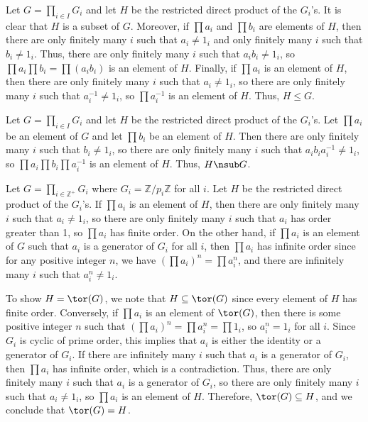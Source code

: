 \begin{solalph}
    \item Let $G = \prod_{i \in I} G_i$ and let $H$ be the restricted direct product of the $G_i$'s. It is clear that $H$ is a subset of $G$. Moreover, if $\prod a_i$ and $\prod b_i$ are elements of $H$, then there are only finitely many $i$ such that $a_i \neq 1_i$ and only finitely many $i$ such that $b_i \neq 1_i$. Thus, there are only finitely many $i$ such that $a_i b_i \neq 1_i$, so $\prod a_i \prod b_i = \prod (a_i b_i)$ is an element of $H$. Finally, if $\prod a_i$ is an element of $H$, then there are only finitely many $i$ such that $a_i \neq 1_i$, so there are only finitely many $i$ such that $a_i^{-1} \neq 1_i$, so $\prod a_i^{-1}$ is an element of $H$. Thus, $H \leq G$.
    \item Let $G = \prod_{i \in I} G_i$ and let $H$ be the restricted direct product of the $G_i$'s. Let $\prod a_i$ be an element of $G$ and let $\prod b_i$ be an element of $H$. Then there are only finitely many $i$ such that $b_i \neq 1_i$, so there are only finitely many $i$ such that $a_i b_i a_i^{-1} \neq 1_i$, so $\prod a_i \prod b_i \prod a_i^{-1}$ is an element of $H$. Thus, $H \nsub G$.
    \item Let $G = \prod_{i \in \mathbb{Z}^+} G_i$ where $G_i = \mathbb{Z}/p_i\mathbb{Z}$ for all $i$. Let $H$ be the restricted direct product of the $G_i$'s. If $\prod a_i$ is an element of $H$, then there are only finitely many $i$ such that $a_i \neq 1_i$, so there are only finitely many $i$ such that $a_i$ has order greater than 1, so $\prod a_i$ has finite order. On the other hand, if $\prod a_i$ is an element of $G$ such that $a_i$ is a generator of $G_i$ for all $i$, then $\prod a_i$ has infinite order since for any positive integer $n$, we have $(\prod a_i)^n = \prod a_i^n$, and there are infinitely many $i$ such that $a_i^n \neq 1_i$.
    
    To show $H = \tor(G)$, we note that $H \subseteq \tor(G)$ since every element of $H$ has finite order. Conversely, if $\prod a_i$ is an element of $\tor(G)$, then there is some positive integer $n$ such that $(\prod a_i)^n = \prod a_i^n = \prod 1_i$, so $a_i^n = 1_i$ for all $i$. Since $G_i$ is cyclic of prime order, this implies that $a_i$ is either the identity or a generator of $G_i$. If there are infinitely many $i$ such that $a_i$ is a generator of $G_i$, then $\prod a_i$ has infinite order, which is a contradiction. Thus, there are only finitely many $i$ such that $a_i$ is a generator of $G_i$, so there are only finitely many $i$ such that $a_i \neq 1_i$, so $\prod a_i$ is an element of $H$. Therefore, $\tor(G) \subseteq H$, and we conclude that $\tor(G) = H$.
\end{solalph}

